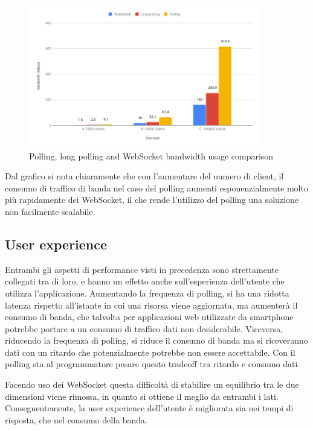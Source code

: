 \documentclass[12pt,a4paper,openright,twoside]{report}
\begin{document}
\begin{figure}[htbp]
\centering
\includegraphics[width=0.9\textwidth]{assets/bandwidth.png}
\caption{Polling, long polling and WebSocket bandwidth usage comparison}
\label{fig:bandwidth}
\end{figure}

Dal grafico si nota chiaramente che con l'aumentare del numero di client, il consumo di traffico di banda nel caso del polling aumenti esponenzialmente molto più rapidamente dei WebSocket, il che rende l'utilizzo del polling una soluzione non facilmente scalabile.

\subsection{User experience}
Entrambi gli aspetti di performance visti in precedenza sono strettamente collegati tra di loro, e hanno un effetto anche sull'esperienza dell'utente che utilizza l'applicazione. Aumentando la frequenza di polling, si ha una ridotta latenza rispetto all'istante in cui una risorsa viene aggiornata, ma aumenterà il consumo di banda, che talvolta per applicazioni web utilizzate da smartphone potrebbe portare a un consumo di traffico dati non desiderabile. Viceversa, riducendo la frequenza di polling, si riduce il consumo di banda ma si riceveranno dati con un ritardo che potenzialmente potrebbe non essere accettabile. Con il polling sta al programmatore pesare questo tradeoff tra ritardo e consumo dati.

Facendo uso dei WebSocket questa difficoltà di stabilire un equilibrio tra le due dimensioni viene rimossa, in quanto si ottiene il meglio da entrambi i lati. Conseguentemente, la user experience dell'utente è migliorata sia nei tempi di risposta, che nel consumo della banda.

\end{document}

